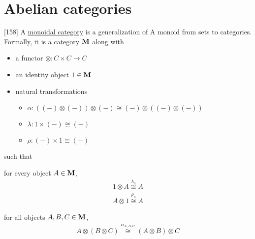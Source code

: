 \section{Abelian categories}\label{sec:abelian_categories}

\begin{definition}\label{def:monoidal_category}\cite{MacLane1994}[158]
  A \ul{monoidal category} is a generalization of A monoid from sets to categories. Formally, it is a category $\operatorname{\mathbf{M}}$ along with
  \begin{itemize}
    \item a functor $\otimes: C \times C \to C$
    \item an identity object $1 \in \operatorname{\mathbf{M}}$
    \item natural transformations
    \begin{itemize}
      \item[] $\alpha: ((-) \otimes (-)) \otimes (-) \cong (-) \otimes ((-) \otimes (-))$
      \item[] $\lambda: 1 \times (-) \cong (-)$
      \item[] $\rho: (-) \times 1 \cong (-)$
    \end{itemize}
  \end{itemize}
  such that
  \begin{defenum}
    \item for every object $A \in \operatorname{\mathbf{M}}$,
    \begin{align*}
      1 \otimes A \overset {\lambda_a} \cong A
      \\
      A \otimes 1 \overset {\rho_a} \cong A
    \end{align*}

    \item for all objects $A, B, C \in \operatorname{\mathbf{M}}$,
    \begin{align*}
      A \otimes (B \otimes C) \overset {\alpha_{A,B,C}} \cong (A \otimes B) \otimes C
    \end{align*}


\end{defenum}
\end{definition}
